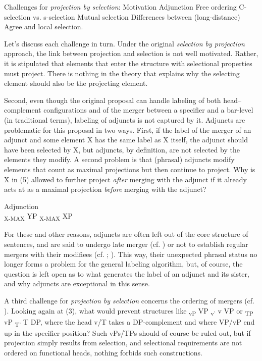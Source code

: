 \documentclass[output=paper
,modfonts
,nonflat]{langsci/langscibook}
\begin{document}
\begin{exe}
\ex Challenges for \textit{projection by selection}:
	\xlist
	\ex Motivation
	\ex Adjunction
	\ex Free ordering
	\ex C-selection vs. s-selection
	\ex Mutual selection
	\ex Differences between (long-distance) Agree and local selection.
	\endxlist
\end{exe}
Let’s discuss each challenge in turn. Under the original \textit{selection by projection} approach, the link between projection and selection is not well motivated. Rather, it is stipulated that elements that enter the structure with selectional properties must project. There is nothing in the theory that explains why the selecting element should also be the projecting element.  

Second, even though the original proposal can handle labeling of both head–complement configurations and of the merger between a specifier and a bar-level (in traditional terms), labeling of adjuncts is not captured by it. Adjuncts are problematic for this proposal in two ways. First, if the label of the merger of an adjunct and some element X has the same label as X itself, the adjunct should have been selected by X, but adjuncts, by definition, are not selected by the elements they modify. A second problem is that (phrasal) adjuncts modify elements that count as maximal projections but then continue to project. Why is X in (5) allowed to further project \textit{after} merging with the adjunct if it already acts at as a maximal projection \textit{before} merging with the adjunct?  

\begin{exe}
\ex Adjunction \\
	{\lbrack} \textsubscript{X-MAX} YP{\lbrack} \textsubscript{X-MAX} XP{\rbrack}{\rbrack}
\end{exe}
For these and other reasons, adjuncts are often left out of the core structure of sentences, and are said to undergo late merger (cf. \citealt{Lebaux1988}) or not to establish regular mergers with their modifiees (cf. \citealt{Chomsky2001}; \citealt{Hornstein_Nunes2009}). This way, their unexpected phrasal status no longer forms a problem for the general labeling algorithm, but, of course, the question is left open as to what generates the label of an adjunct and its sister, and why adjuncts are exceptional in this sense.

A third challenge for \textit{projection by selection} concerns the ordering of mergers (cf. \citealt{Adger2013}). Looking again at (3), what would prevent structures like {\lbrack}\textsubscript{vP} VP {\lbrack}\textsubscript{v'} v VP{\rbrack}{\rbrack} or {\lbrack}\textsubscript{TP} vP {\lbrack}\textsubscript{T'} T DP{\rbrack}{\rbrack}, where the head v/T takes a DP-complement and where VP/vP end up in the specifier position? Such vPs/TPs should of course be ruled out, but if projection simply results from selection, and selectional requirements are not ordered on functional heads, nothing forbids such constructions.
\end{document}
